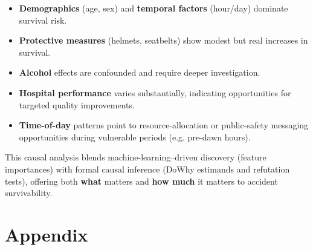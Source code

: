 \documentclass[a4paper]{article}
\begin{document}
\begin{itemize}
    \item \textbf{Demographics} (age, sex) and \textbf{temporal factors} (hour/day) dominate survival risk.
    \item \textbf{Protective measures} (helmets, seatbelts) show modest but real increases in survival.
    \item \textbf{Alcohol} effects are confounded and require deeper investigation.
    \item \textbf{Hospital performance} varies substantially, indicating opportunities for targeted quality improvements.
    \item \textbf{Time-of-day} patterns point to resource-allocation or public-safety messaging opportunities during vulnerable periods (e.g. pre-dawn hours).
\end{itemize}

This causal analysis blends machine-learning--driven discovery (feature importances) with formal causal inference (DoWhy estimands and refutation tests), offering both \textbf{what} matters and \textbf{how much} it matters to accident survivability.

\section*{Appendix}
\end{document}
